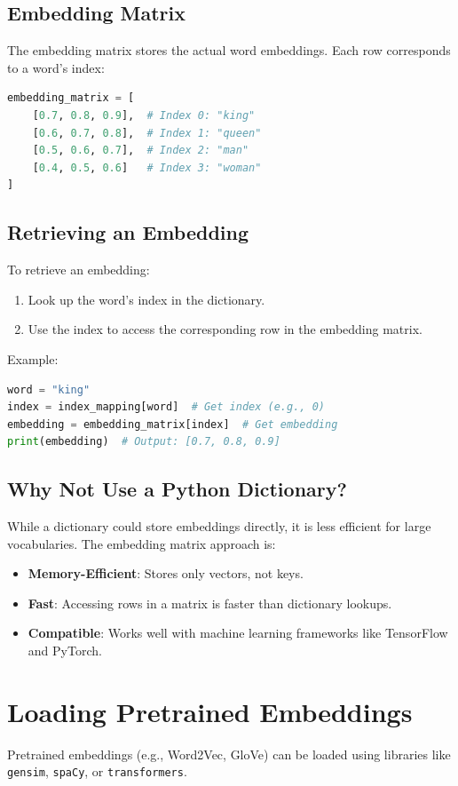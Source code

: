 \begin{notechapter}
\subsection{Embedding Matrix}
The embedding matrix stores the actual word embeddings. Each row 
corresponds to a word's index:
\begin{lstlisting}[language=Python]
embedding_matrix = [
    [0.7, 0.8, 0.9],  # Index 0: "king"
    [0.6, 0.7, 0.8],  # Index 1: "queen"
    [0.5, 0.6, 0.7],  # Index 2: "man"
    [0.4, 0.5, 0.6]   # Index 3: "woman"
]
\end{lstlisting}

\subsection{Retrieving an Embedding}
To retrieve an embedding:
\begin{enumerate}
    \item Look up the word's index in the dictionary.
    \item Use the index to access the corresponding row in the 
    embedding matrix.
\end{enumerate}
Example:
\begin{lstlisting}[language=Python]
word = "king"
index = index_mapping[word]  # Get index (e.g., 0)
embedding = embedding_matrix[index]  # Get embedding
print(embedding)  # Output: [0.7, 0.8, 0.9]
\end{lstlisting}

\subsection{Why Not Use a Python Dictionary?}
While a dictionary could store embeddings directly, it is less 
efficient for large vocabularies. The embedding matrix approach 
is:
\begin{itemize}
    \item \textbf{Memory-Efficient}: Stores only vectors, not 
    keys.
    \item \textbf{Fast}: Accessing rows in a matrix is faster than 
    dictionary lookups.
    \item \textbf{Compatible}: Works well with machine learning 
    frameworks like TensorFlow and PyTorch.
\end{itemize}

\section{Loading Pretrained Embeddings}
Pretrained embeddings (e.g., Word2Vec, GloVe) can be loaded using 
libraries like \texttt{gensim}, \texttt{spaCy}, or 
\texttt{transformers}.


\end{notechapter}

